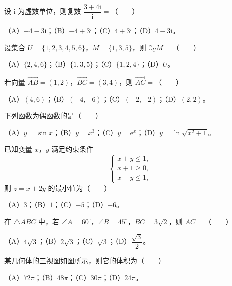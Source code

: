\begin{question}
设 $\mathrm i$ 为虚数单位，则复数 $\dfrac{3+4\mathrm i}{\mathrm i}=$\mbox{（　　）}

（A）$-4-3\mathrm i$；（B）$-4+3\mathrm i$；（C）$4+3\mathrm i$；（D）$4-3\mathrm i$。

\end{question}
\begin{question}
设集合 $U=\{1,2,3,4,5,6\}$，$M=\{1,3,5\}$，则 $\complement_U M=$\mbox{（　　）}

（A）$\{2,4,6\}$；（B）$\{1,3,5\}$；（C）$\{1,2,4\}$；（D）$U$。

\end{question}
\begin{question}
若向量 $\overrightarrow{AB}=(1,2)$，$\overrightarrow{BC}=(3,4)$，则 $\overrightarrow{AC}=$\mbox{（　　）}

（A）$(4,6)$；（B）$(-4,-6)$；（C）$(-2,-2)$；（D）$(2,2)$。

\end{question}
\begin{question}
下列函数为偶函数的是\mbox{（　　）}

（A）$y=\sin x$；（B）$y=x^3$；（C）$y=\mathrm e^x$；（D）$y=\ln\sqrt{x^2+1}$。

\end{question}
\begin{question}
已知变量 $x$，$y$ 满足约束条件
\nopagebreak[4]
\[\begin{cases}x+y\leqslant1,\\ x+1\geqslant0,\\ x-y\leqslant1,\end{cases}\]
则 $z=x+2y$ 的最小值为\mbox{（　　）}

（A）$3$；（B）$1$；（C）$-5$；（D）$-6$。

\end{question}
\begin{question}
在 $\triangle ABC$ 中，若 $\angle A=60^\circ$，$\angle B=45^\circ$，$BC=3\sqrt2$，则 $AC=$\mbox{（　　）}

（A）$4\sqrt3$；（B）$2\sqrt3$；（C）$\sqrt3$；（D）$\dfrac{\sqrt3}{2}$。

\Needspace{0.4\textheight}
\end{question}
\begin{question}
某几何体的三视图如图所示，则它的体积为\mbox{（　　）}
\nopagebreak[4]
\begin{center}\end{center}
\nopagebreak[4]
（A）$72\pi$；（B）$48\pi$；（C）$30\pi$；（D）$24\pi$。

\end{question}
